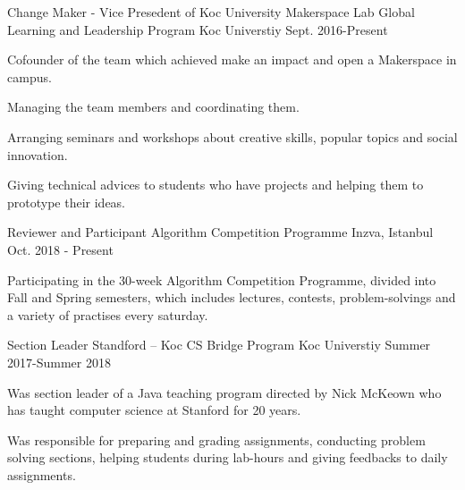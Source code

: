 

\begin{cventries}
  \cventry
    {Change Maker - Vice Presedent of Koc University Makerspace Lab} %
    {Global Learning and Leadership Program} %
    {Koc Universtiy} %
    {Sept. 2016-Present} %
    {
      \begin{cvitems} %
        \item {Cofounder of the team which achieved make an impact and open a Makerspace in campus.}
        \item {Managing the team members and coordinating them.}
        \item {Arranging seminars and workshops about creative skills, popular topics and social innovation. }
        \item {Giving technical advices to students who have projects and helping them to prototype their ideas.}
      \end{cvitems}
    }
  \cventry
    {Reviewer and Participant} %
    {Algorithm Competition Programme} %
    {Inzva, Istanbul} %
    {Oct. 2018 - Present} %
    {
      \begin{cvitems} %
        \item {Participating in the 30-week Algorithm Competition Programme, divided into Fall and Spring semesters, which includes lectures, contests, problem-solvings and a variety of practises every saturday.}
      \end{cvitems}
    }


  \cventry
    {Section Leader } %
    {Standford – Koc CS Bridge Program} %
    {Koc Universtiy} %
    {Summer 2017-Summer 2018} %
    {
      \begin{cvitems} %
        \item {Was section leader of a Java teaching program directed by Nick McKeown who has taught computer science at Stanford for 20 years.}
        \item {Was responsible for preparing and grading assignments, conducting problem solving sections, helping students during lab-hours and giving feedbacks to daily assignments.}
      \end{cvitems}
    }
    

\end{cventries}
